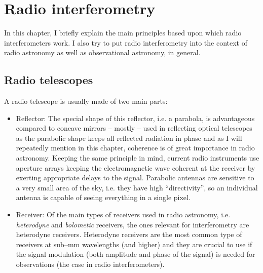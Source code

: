 \documentclass[a4wide,12pt]{book}
\newcommand{\ignore}[1]{}
\begin{document}
{%
\chapter{Radio interferometry}
In this chapter, I briefly explain the main principles based upon which radio interferometers work. I also try to put radio interferometry into the context of radio astronomy as well as observational astronomy, in general.

\section{Radio telescopes}
A radio telescope is usually made of two main parts:
\begin{itemize}
\item Reflector: The special shape of this reflector, i.e. a parabola, is advantageous compared to concave mirrors -- mostly -- used in reflecting optical telescopes as the parabolic shape keeps all reflected radiation in phase and as I will repeatedly mention in this chapter, coherence is of great importance in radio astronomy. Keeping the same principle in mind, current radio instruments use aperture arrays keeping the electromagnetic wave coherent at the receiver by exerting appropriate delays to the signal. Parabolic antennas are sensitive to a very small area of the sky, i.e. they have high ``directivity'', so an individual antenna is capable of seeing everything in a single pixel.
\item Receiver: Of the main types of receivers used in radio astronomy, i.e. \emph{heterodyne} and \emph{bolometic} receivers, the ones relevant for interferometry are heterodyne receivers. Heterodyne receivers are the most common type of receivers at sub--mm wavelengths (and higher) and they are crucial to use if the signal modulation (both amplitude and phase of the signal) is needed for observations (the case in radio interferometers).
\end{itemize}



}
\end{document}
